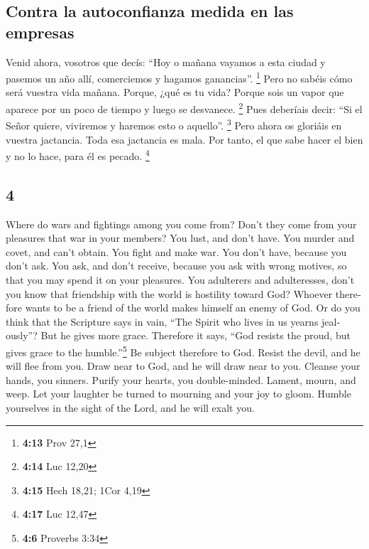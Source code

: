 \begin{paracol}{2}
\hypertarget{contra-la-autoconfianza-medida-en-las-empresas}{%
\subsection{Contra la autoconfianza medida en las
empresas}\label{contra-la-autoconfianza-medida-en-las-empresas}}

 Venid ahora, vosotros que decís: ``Hoy o mañana vayamos
a esta ciudad y pasemos un año allí, comerciemos y hagamos ganancias''.
\footnote{\textbf{4:13} Prov 27,1}  Pero no sabéis cómo
será vuestra vida mañana. Porque, ¿qué es tu vida? Porque sois un vapor
que aparece por un poco de tiempo y luego se desvanece. \footnote{\textbf{4:14}
  Luc 12,20}  Pues deberíais decir: ``Si el Señor quiere,
viviremos y haremos esto o aquello''. \footnote{\textbf{4:15} Hech
  18,21; 1Cor 4,19}  Pero ahora os gloriáis en vuestra
jactancia. Toda esa jactancia es mala.  Por tanto, el que
sabe hacer el bien y no lo hace, para él es pecado. \footnote{\textbf{4:17}
  Luc 12,47}

\switchcolumn
\begin{otherlanguage}{english}

\hypertarget{section-7}{%
\section{4}\label{section-7}}

 Where do wars and fightings among you come from? Don't
they come from your pleasures that war in your members? 
You lust, and don't have. You murder and covet, and can't obtain. You
fight and make war. You don't have, because you don't ask.
 You ask, and don't receive, because you ask with wrong
motives, so that you may spend it on your pleasures.  You
adulterers and adulteresses, don't you know that friendship with the
world is hostility toward God? Whoever therefore wants to be a friend of
the world makes himself an enemy of God.  Or do you think
that the Scripture says in vain, ``The Spirit who lives in us yearns
jealously''?  But he gives more grace. Therefore it says,
``God resists the proud, but gives grace to the humble.''\footnote{\textbf{4:6}
  Proverbs 3:34}  Be subject therefore to God. Resist the
devil, and he will flee from you.  Draw near to God, and
he will draw near to you. Cleanse your hands, you sinners. Purify your
hearts, you double-minded.  Lament, mourn, and weep. Let
your laughter be turned to mourning and your joy to gloom.
 Humble yourselves in the sight of the Lord, and he will
exalt you.


\end{otherlanguage}
\end{paracol}
